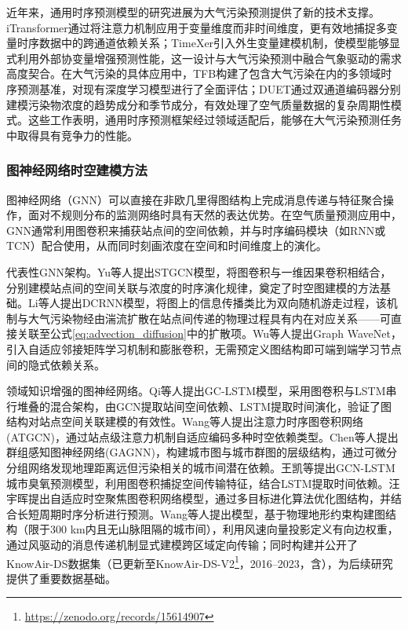 近年来，通用时序预测模型的研究进展为大气污染预测提供了新的技术支撑。iTransformer\citep{liuitransformer}通过将注意力机制应用于变量维度而非时间维度，更有效地捕捉多变量时序数据中的跨通道依赖关系；TimeXer\citep{wang2024timexer}引入外生变量建模机制，使模型能够显式利用外部协变量增强预测性能，这一设计与大气污染预测中融合气象驱动的需求高度契合。在大气污染的具体应用中，TFB\citep{qiu2024tfb}构建了包含大气污染在内的多领域时序预测基准，对现有深度学习模型进行了全面评估；DUET\citep{qiu2025duet}通过双通道编码器分别建模污染物浓度的趋势成分和季节成分，有效处理了空气质量数据的复杂周期性模式。这些工作表明，通用时序预测框架经过领域适配后，能够在大气污染预测任务中取得具有竞争力的性能。

\subsubsection{图神经网络时空建模方法}

图神经网络（GNN）可以直接在非欧几里得图结构上完成消息传递与特征聚合操作，面对不规则分布的监测网络时具有天然的表达优势\citep{zhou2020graph}。在空气质量预测应用中，GNN通常利用图卷积来捕获站点间的空间依赖，并与时序编码模块（如RNN或TCN）配合使用，从而同时刻画浓度在空间和时间维度上的演化\citep{wu2020comprehensive}。

代表性GNN架构。Yu等人\citep{yu2018spatio}提出STGCN模型，将图卷积与一维因果卷积相结合，分别建模站点间的空间关联与浓度的时序演化规律，奠定了时空图建模的方法基础。Li等人\citep{li2018diffusion}提出DCRNN模型，将图上的信息传播类比为双向随机游走过程，该机制与大气污染物经由湍流扩散在站点间传递的物理过程具有内在对应关系——可直接关联至公式\eqref{eq:advection_diffusion}中的扩散项。Wu等人\citep{wu2019graph}提出Graph WaveNet，引入自适应邻接矩阵学习机制和膨胀卷积，无需预定义图结构即可端到端学习节点间的隐式依赖关系。

领域知识增强的图神经网络。Qi等人\citep{qi2019hybrid}提出GC-LSTM模型，采用图卷积与LSTM串行堆叠的混合架构，由GCN提取站间空间依赖、LSTM提取时间演化，验证了图结构对站点空间关联建模的有效性。Wang等人\citep{wang2021modeling}提出注意力时序图卷积网络(ATGCN)，通过站点级注意力机制自适应编码多种时空依赖类型。Chen等人\citep{chen2023group}提出群组感知图神经网络(GAGNN)，构建城市图与城市群图的层级结构，通过可微分分组网络发现地理距离远但污染相关的城市间潜在依赖。王凯等\citep{cn_wangkai2023gcnlstm}提出GCN-LSTM城市臭氧预测模型，利用图卷积捕捉空间传输特征，结合LSTM提取时间依赖。汪宇晖\citep{cn_wangyuhui2023stgnn}提出自适应时空聚焦图卷积网络模型，通过多目标进化算法优化图结构，并结合长短周期时序分析进行\PM 预测。Wang等人\citep{wang2020pm2}提出\ModelPred{}模型，基于物理地形约束构建图结构（限于300 km内且无山脉阻隔的城市间），利用风速向量投影定义有向边权重，通过风驱动的消息传递机制显式建模跨区域定向传输；同时构建并公开了KnowAir-DS数据集（已更新至KnowAir-DS-V2\footnote{\url{https://zenodo.org/records/15614907}}，2016--2023，含\ozone），为后续研究提供了重要数据基础。

